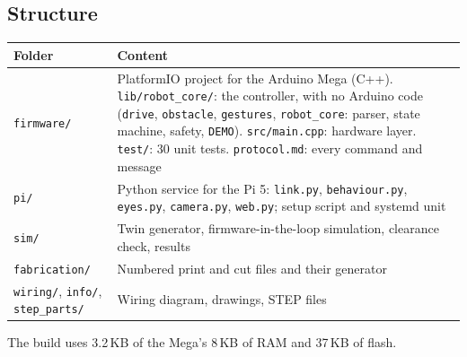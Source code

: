 \documentclass[11pt,a4paper]{article}
\newcommand{\file}[1]{{\small\nolinkurl{#1}}}
\begin{document}
\subsection{Structure}
\begin{table}[H]\small
\begin{tabularx}{\linewidth}{@{}P{38mm}L@{}}
\toprule
\textbf{Folder} & \textbf{Content}\\
\midrule
\file{firmware/} & PlatformIO project for the Arduino Mega (C++). \file{lib/robot_core/}: the controller, with no Arduino code (\file{drive}, \file{obstacle}, \file{gestures}, \file{robot_core}: parser, state machine, safety, \texttt{DEMO}). \file{src/main.cpp}: hardware layer. \file{test/}: 30 unit tests. \file{protocol.md}: every command and message\\
\file{pi/} & Python service for the Pi 5: \file{link.py}, \file{behaviour.py}, \file{eyes.py}, \file{camera.py}, \file{web.py}; setup script and systemd unit\\
\file{sim/} & Twin generator, firmware-in-the-loop simulation, clearance check, results\\
\file{fabrication/} & Numbered print and cut files and their generator\\
\file{wiring/}, \file{info/}, \file{step_parts/} & Wiring diagram, drawings, STEP files\\
\bottomrule
\end{tabularx}
\end{table}
The build uses 3.2\,KB of the Mega's 8\,KB of RAM and 37\,KB of flash.
\end{document}
